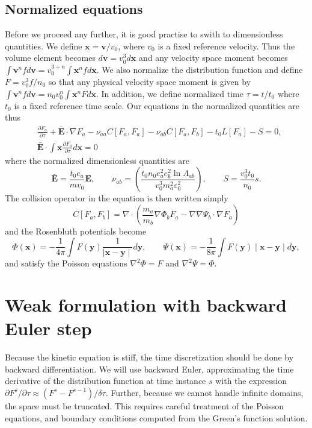 \documentclass[preprint]{revtex4}
\begin{document}
\subsection{Normalized equations}
Before we proceed any further, it is good practise to swith to dimensionless quantities. We define $\bm{x}=\bm{v}/v_0$, where $v_0$ is a fixed reference velocity. Thus the volume element becomes $d\bm{v}=v_0^3d\bm{x}$ and any velocity space moment becomes $\int \bm{v}^n fd\bm{v}=v_0^{3+n}\int \bm{x}^nf d\bm{x}$. We also normalize the distribution function and define $F=v_0^3f/n_0$ so that any physical velocity space moment is given by $\int \bm{v}^n fd\bm{v}=n_0v_0^{n}\int \bm{x}^nF d\bm{x}$. In addition, we define normalized time $\tau=t/t_0$ where $t_0$ is a fixed reference time scale. Our equations in the normalized quantities are thus
\begin{align}
&\frac{\partial F_a}{\partial\tau}+\bar{\bm{E}}\cdot\nabla F_a-\nu_{aa} C[F_a,F_a]-\nu_{ab} C[F_a,F_b]-t_0L[F_a]-S=0,\\
&\bar{\bm{E}}\cdot\int\bm{x}\frac{\partial F_a}{\partial\tau}d\bm{x}=0
\end{align}
where the normalized dimensionless quantities are
\begin{equation}
\bar{\bm{E}}=\frac{t_0e_a}{mv_0}\bm{E},\qquad \nu_{ab}=\left(\frac{t_0n_0e_a^2e_b^2\ln\Lambda_{ab}}{v_0^3m_a^2\varepsilon_0^2}\right),\qquad S=\frac{v_0^3t_0}{n_0}s.
\end{equation}
The collision operator in the equation is then written simply
\begin{equation}
C[F_a,F_b]=\nabla\cdot\left(\frac{m_a}{m_b}\nabla\Phi_b F_a-\nabla\nabla\Psi_b\cdot\nabla F_a\right)
\end{equation}
and the Rosenbluth potentials become
\begin{equation}
\Phi(\bm{x})=-\frac{1}{4\pi}\int F(\bm{y})\frac{1}{\mid \bm{x}-\bm{y}\mid}d\bm{y},\qquad \Psi(\bm{x})=-\frac{1}{8\pi}\int F(\bm{y})\mid \bm{x}-\bm{y}\mid d\bm{y},
\end{equation}
and satisfy the Poisson equations $\nabla^2\Phi = F$ and $\nabla^2\Psi =\Phi$.

\section{Weak formulation with backward Euler step}
Because the kinetic equation is stiff, the time discretization should be done by backward differentiation. We will use backward Euler, approximating the time derivative of the distribution function at time instance $s$ with the expression $\partial F^{s}/\partial\tau\approx (F^{s}-F^{s-1})/\delta \tau$. Further, because we cannot handle infinite domains, the space must be truncated. This requires careful treatment of the Poisson equations, and boundary conditions computed from the Green's function solution.
\end{document}
